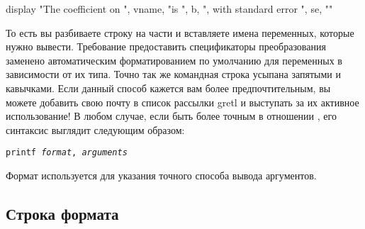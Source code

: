\begin{code}
display "The coefficient on ", vname, "is ", b, ", with standard error ", se, "\n"
\end{code}
То есть вы разбиваете строку на части и вставляете имена переменных,
которые нужно вывести. Требование предоставить спецификаторы
преобразования заменено автоматическим форматированием по умолчанию
для переменных в зависимости от их типа. Точно так же командная строка
усыпана запятыми и кавычками. Если данный способ кажется вам более
предпочтительным, вы можете добавить свою почту в список рассылки
gretl и выступать за их активное использование!  В любом случае, если
быть более точным в отношении , его синтаксис выглядит
следующим образом:
\begin{flushleft}
  \texttt{printf \emph{format}, \emph{arguments}}
\end{flushleft}
Формат используется для указания точного способа вывода аргументов.

\subsection{Строка формата}
\label{sec:fmtstring}


